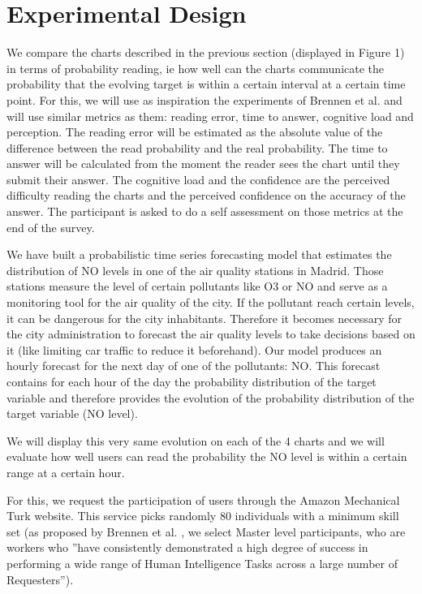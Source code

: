 \documentclass[a4paper,3p,sort&compress]{elsarticle}
\begin{document}
\section{Experimental Design}
\label{sec:exp_design}

We compare the charts described in the previous section (displayed in Figure 1) 
in terms of probability 
reading, ie how well 
can the charts communicate the probability that the evolving target is within a certain interval 
at a certain time point.
 For this, we will use as inspiration the experiments of Brennen et al. \cite{brennen_instrument_2018}
and will use similar metrics 
as them: reading error, time to answer, cognitive load and perception. The reading error will be estimated as the 
absolute value of the difference between the read probability and the real probability. The time to answer 
will be calculated from the moment the reader sees the chart until they submit their answer. The cognitive 
load and the confidence are the perceived difficulty reading the charts and the perceived confidence on 
the accuracy of 
the answer. The participant is asked to do a self assessment on those metrics at the end of the survey.

We have built a probabilistic time series forecasting model that estimates the distribution of NO 
levels in one of the air quality stations in Madrid. Those stations measure the level of certain 
pollutants like O3 or NO and serve as a monitoring tool for the air quality of the city. If the pollutant 
reach certain levels, it can be dangerous for the city inhabitants. Therefore it becomes necessary 
for the city administration to 
forecast the air quality levels to take decisions based on it (like limiting car traffic to reduce it beforehand).
Our model produces an hourly forecast for the next day of one of the pollutants: NO. This forecast contains
for each hour of the day the probability distribution of the target variable and therefore provides the evolution 
of the probability distribution of the target variable (NO level).

We will display this very same evolution on each of the 4 charts and we will evaluate how well users can 
read the probability the NO level is within a certain range at a certain hour. 

For this, we request the participation of users through the Amazon Mechanical Turk website. 
This service picks randomly 80 individuals with a minimum skill set (as proposed by Brennen 
et al. \cite{brennen_instrument_2018}, we select Master level participants, who are workers who 
''have consistently demonstrated a high degree of success in performing a wide range of Human Intelligence Tasks across a 
large number of Requesters'').
\end{document}

